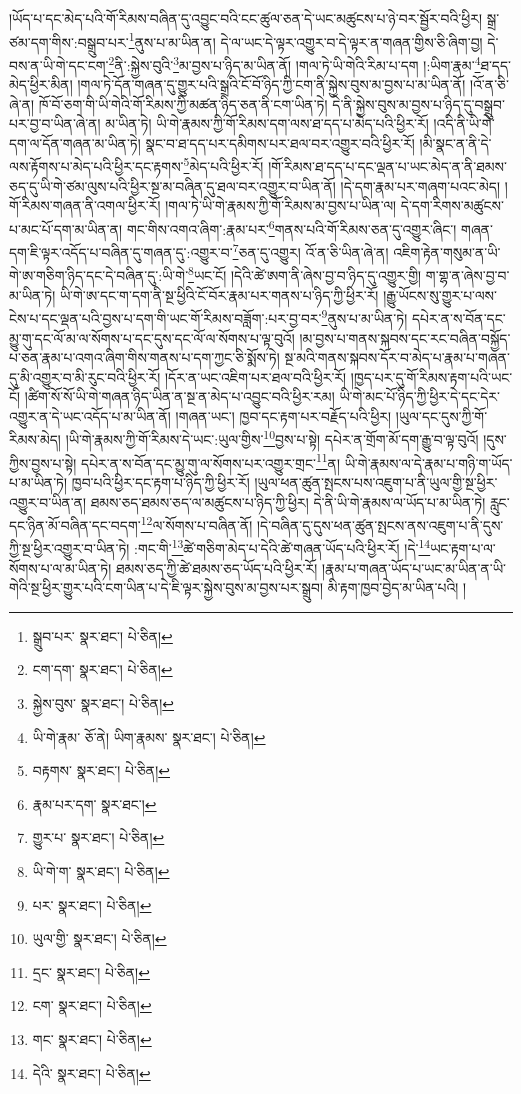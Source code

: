 །ཡོད་པ་དང་མེད་པའི་གོ་རིམས་བཞིན་དུ་འབྱུང་བའི་ངང་ཚུལ་ཅན་དེ་ཡང་མཚུངས་པ་ཉེ་བར་སྦྱོར་བའི་ཕྱིར། སྒྲ་ཙམ་དག་གིས་:བསྒྲུབ་པར་\footnote{སྒྲུབ་པར་  སྣར་ཐང་།  པེ་ཅིན། }ནུས་པ་མ་ཡིན་ན། དེ་ལ་ཡང་དེ་ལྟར་འགྱུར་བ་དེ་ལྟར་ན་གཞན་གྱིས་ཅི་ཞིག་བྱ། དེ་བས་ན་ཡི་གེ་དང་ངག་\footnote{ངག་དག་  སྣར་ཐང་།  པེ་ཅིན། }ནི་:སྐྱེས་བུའི་\footnote{སྐྱེས་བུས་  སྣར་ཐང་།  པེ་ཅིན། }མ་བྱས་པ་ཉིད་མ་ཡིན་ནོ། །གལ་ཏེ་ཡི་གེའི་རིམ་པ་དག །:ཡིག་རྣམ་\footnote{ཡི་གེ་རྣམ་  ཅོ་ནེ། ཡིག་རྣམས་  སྣར་ཐང་།  པེ་ཅིན། }ཐ་དད་མེད་ཕྱིར་མིན། །གལ་ཏེ་དོན་གཞན་དུ་གྱུར་པའི་སྒྲའི་ངོ་བོ་ཉིད་ཀྱི་ངག་ནི་སྐྱེས་བུས་མ་བྱས་པ་མ་ཡིན་ནོ། །འོ་ན་ཅི་ཞེ་ན། ཁོ་བོ་ཅག་གི་ཡི་གེའི་གོ་རིམས་ཀྱི་མཚན་ཉིད་ཅན་ནི་ངག་ཡིན་ཏེ། དེ་ནི་སྐྱེས་བུས་མ་བྱས་པ་ཉིད་དུ་བསྒྲུབ་པར་བྱ་བ་ཡིན་ཞེ་ན། མ་ཡིན་ཏེ། ཡི་གེ་རྣམས་ཀྱི་གོ་རིམས་དག་ལས་ཐ་དད་པ་མེད་པའི་ཕྱིར་རོ། །འདི་ནི་ཡི་གེ་དག་ལ་དོན་གཞན་མ་ཡིན་ཏེ། སྣང་བ་ཐ་དད་པར་དམིགས་པར་ཐལ་བར་འགྱུར་བའི་ཕྱིར་རོ། །མི་སྣང་ན་ནི་དེ་ལས་རྟོགས་པ་མེད་པའི་ཕྱིར་དང་རྟགས་\footnote{བརྟགས་  སྣར་ཐང་།  པེ་ཅིན། }མེད་པའི་ཕྱིར་རོ། །གོ་རིམས་ཐ་དད་པ་དང་ལྡན་པ་ཡང་མེད་ན་ནི་ཐམས་ཅད་དུ་ཡི་གེ་ཙམ་ལུས་པའི་ཕྱིར་སྔ་མ་བཞིན་དུ་ཐལ་བར་འགྱུར་བ་ཡིན་ནོ། །དེ་དག་རྣམ་པར་གཞག་པའང་མེད། །གོ་རིམས་གཞན་ནི་འགལ་ཕྱིར་རོ། །གལ་ཏེ་ཡི་གེ་རྣམས་ཀྱི་གོ་རིམས་མ་བྱས་པ་ཡིན་ལ། དེ་དག་རིགས་མཚུངས་པ་མང་པོ་དག་མ་ཡིན་ན། གང་གིས་འགའ་ཞིག་:རྣམ་པར་\footnote{རྣམ་པར་དག་  སྣར་ཐང་། }གནས་པའི་གོ་རིམས་ཅན་དུ་འགྱུར་ཞིང་། གཞན་དག་ཇི་ལྟར་འདོད་པ་བཞིན་དུ་གཞན་དུ་:འགྱུར་བ་\footnote{གྱུར་པ་  སྣར་ཐང་།  པེ་ཅིན། }ཅན་དུ་འགྱུར། འོ་ན་ཅི་ཡིན་ཞེ་ན། འཇིག་རྟེན་གསུམ་ན་ཡི་གེ་ཨ་གཅིག་ཉིད་དང་དེ་བཞིན་དུ་:ཡི་གེ་\footnote{ཡི་གེ་ག་  སྣར་ཐང་།  པེ་ཅིན། }ཡང་ངོ། །དེའི་ཚེ་ཨག་ནི་ཞེས་བྱ་བ་ཉིད་དུ་འགྱུར་གྱི། ག་གྷ་ན་ཞེས་བྱ་བ་མ་ཡིན་ཏེ། ཡི་གེ་ཨ་དང་ག་དག་ནི་སྔ་ཕྱིའི་ངོ་བོར་རྣམ་པར་གནས་པ་ཉིད་ཀྱི་ཕྱིར་རོ། །རྒྱུ་ཡོངས་སུ་གྱུར་པ་ལས་ངེས་པ་དང་ལྡན་པའི་བྱས་པ་དག་གི་ཡང་གོ་རིམས་བཟློག་:པར་བྱ་བར་\footnote{པར་  སྣར་ཐང་།  པེ་ཅིན། }ནུས་པ་མ་ཡིན་ཏེ། དཔེར་ན་ས་བོན་དང་མྱུ་གུ་དང་ལོ་མ་ལ་སོགས་པ་དང་དུས་དང་ལོ་ལ་སོགས་པ་ལྟ་བུའོ། །མ་བྱས་པ་གནས་སྐབས་དང་རང་བཞིན་བསྐྱོད་པ་ཅན་རྣམ་པ་འགའ་ཞིག་གིས་གནས་པ་དག་ཀྱང་ཅི་སྨོས་ཏེ། སྔ་མའི་གནས་སྐབས་དོར་བ་མེད་པ་རྣམ་པ་གཞན་དུ་མི་འགྱུར་བ་མི་རུང་བའི་ཕྱིར་རོ། །དོར་ན་ཡང་འཇིག་པར་ཐལ་བའི་ཕྱིར་རོ། །ཁྱད་པར་དུ་གོ་རིམས་རྟག་པའི་ཡང་ངོ། །ཚིག་སོ་སོ་ཡི་གེ་གཞན་ཉིད་ཡིན་ན་སྔ་ན་མེད་པ་འབྱུང་བའི་ཕྱིར་རམ། ཡི་གེ་མང་པོ་ཉིད་ཀྱི་ཕྱིར་དེ་དང་དེར་འགྱུར་ན་དེ་ཡང་འདོད་པ་མ་ཡིན་ནོ། །གཞན་ཡང་། ཁྱབ་དང་རྟག་པར་བརྗོད་པའི་ཕྱིར། །ཡུལ་དང་དུས་ཀྱི་གོ་རིམས་མེད། །ཡི་གེ་རྣམས་ཀྱི་གོ་རིམས་དེ་ཡང་:ཡུལ་གྱིས་\footnote{ཡུལ་གྱི་  སྣར་ཐང་།  པེ་ཅིན། }བྱས་པ་སྟེ། དཔེར་ན་གྲོག་མོ་དག་རྒྱུ་བ་ལྟ་བུའོ། །དུས་ཀྱིས་བྱས་པ་སྟེ། དཔེར་ན་ས་བོན་དང་མྱུ་གུ་ལ་སོགས་པར་འགྱུར་གྲང་\footnote{དྲང་  སྣར་ཐང་།  པེ་ཅིན། }ན། ཡི་གེ་རྣམས་ལ་དེ་རྣམ་པ་གཉི་ག་ཡོད་པ་མ་ཡིན་ཏེ། ཁྱབ་པའི་ཕྱིར་དང་རྟག་པ་ཉིད་ཀྱི་ཕྱིར་རོ། །ཡུལ་ཕན་ཚུན་སྤངས་པས་འཇུག་པ་ནི་ཡུལ་གྱི་སྔ་ཕྱིར་འགྱུར་བ་ཡིན་ན། ཐམས་ཅད་ཐམས་ཅད་ལ་མཚུངས་པ་ཉིད་ཀྱི་ཕྱིར། དེ་ནི་ཡི་གེ་རྣམས་ལ་ཡོད་པ་མ་ཡིན་ཏེ། རླུང་དང་ཉིན་མོ་བཞིན་དང་བདག་\footnote{ངག་  སྣར་ཐང་།  པེ་ཅིན། }ལ་སོགས་པ་བཞིན་ནོ། །དེ་བཞིན་དུ་དུས་ཕན་ཚུན་སྤངས་ནས་འཇུག་པ་ནི་དུས་ཀྱི་སྔ་ཕྱིར་འགྱུར་བ་ཡིན་ཏེ། :གང་གི་\footnote{གང་  སྣར་ཐང་།  པེ་ཅིན། }ཚེ་གཅིག་མེད་པ་དེའི་ཚེ་གཞན་ཡོད་པའི་ཕྱིར་རོ། །དེ་\footnote{དེའི་  སྣར་ཐང་།  པེ་ཅིན། }ཡང་རྟག་པ་ལ་སོགས་པ་ལ་མ་ཡིན་ཏེ། ཐམས་ཅད་ཀྱི་ཚེ་ཐམས་ཅད་ཡོད་པའི་ཕྱིར་རོ། །རྣམ་པ་གཞན་ཡོད་པ་ཡང་མ་ཡིན་ན་ཡི་གེའི་སྔ་ཕྱིར་གྱུར་པའི་ངག་ཡིན་པ་དེ་ཇི་ལྟར་སྐྱེས་བུས་མ་བྱས་པར་སྒྲུབ། མི་རྟག་ཁྱབ་བྱེད་མ་ཡིན་པའི། །

